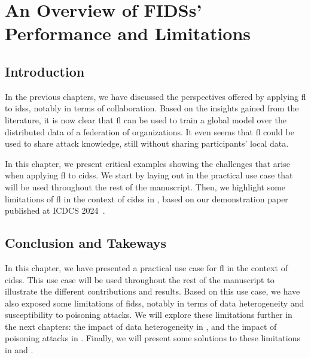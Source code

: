 \chapter{An Overview of FIDSs' Performance and Limitations\label{chap:app}}

\section{Introduction\label{sec:app.intro}}

In the previous chapters, we have discussed the perspectives offered by applying \gls{fl} to \glspl{ids}, notably in terms of collaboration.
Based on the insights gained from the literature, it is now clear that \gls{fl} can be used to train a global model over the distributed data of a federation of organizations.
It even seems that \gls{fl} could be used to share attack knowledge, still without sharing participants' local data.

In this chapter, we present critical examples showing the challenges that arise when applying \gls{fl} to \glspl{cids}.
We start by laying out in  the practical use case that will be used throughout the rest of the manuscript.
Then, we highlight some limitations of \gls{fl} in the context of \glspl{cids} in , based on our demonstration paper published at ICDCS 2024~\cite{lavaur_icdcs_demo_2024}.




%


\section{Conclusion and Takeways\label{sec:app.conclusion}}

In this chapter, we have presented a practical use case for \gls{fl} in the context of \glspl{cids}.
This use case will be used throughout the rest of the manuscript to illustrate the different contributions and results.
Based on this use case, we have also exposed some limitations of \glspl{fids}, notably in terms of data heterogeneity and susceptibility to poisoning attacks.
We will explore these limitations further in the next chapters: the impact of data heterogeneity in , and the impact of poisoning attacks in .
Finally, we will present some solutions to these limitations in  and .